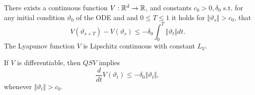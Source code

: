 
There exists a continuous function \(V:\mathbb{R}^d\to\mathbb{R}\), and constants
\(c_0>0,\delta_0\) s.t. for any initial condition \(\vartheta_0\) of the ODE and 
and \(0\leq T\leq 1\) it holds for \(\Vert \vartheta_s\Vert>c_0\), that 
\[V(\vartheta_{s+T})-V(\vartheta_s)\leq -\delta_0\int_0^T\Vert  \vartheta_t\Vert dt.\]
The Lyapunov function \(V\) is Lipschitz continuous with constant \(L_V\).  


If \(V\) is differentiable, then \(QSV\) implies 
\[\frac{d}{dt}V(\vartheta_t)\leq -\delta_0\Vert \vartheta_t\Vert,\]
whenever \(\Vert \vartheta_t\Vert >c_0\).


